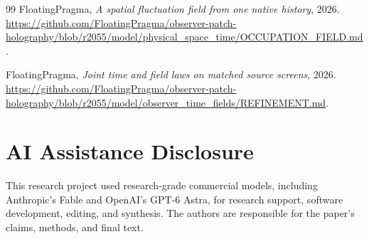 \documentclass[11pt]{article}
\theoremstyle{remark}
\theoremstyle{plain}
\begin{document}
\begin{thebibliography}{99}
FloatingPragma,
\emph{A spatial fluctuation field from one native history},
2026.
\url{https://github.com/FloatingPragma/observer-patch-holography/blob/r2055/model/physical_space_time/OCCUPATION_FIELD.md}.

FloatingPragma,
\emph{Joint time and field laws on matched source screens},
2026.
\url{https://github.com/FloatingPragma/observer-patch-holography/blob/r2055/model/observer_time_fields/REFINEMENT.md}.

\end{thebibliography}

\section*{AI Assistance Disclosure}
This research project used research-grade commercial models, including
Anthropic's Fable and OpenAI's GPT-6 Astra, for research support, software
development, editing, and synthesis. The authors are responsible for the
paper's claims, methods, and final text.
\end{document}
